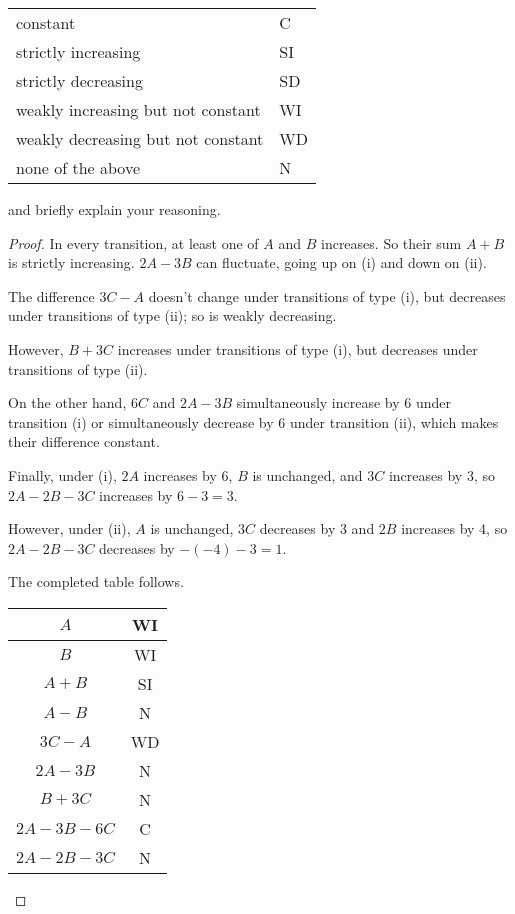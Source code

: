 \documentclass[14pt]{extarticle}
\begin{document}
\begin{center}
\begin{tabular}{|ll|}
\hline
constant & C \\
strictly increasing & SI \\
strictly decreasing & SD \\
weakly increasing but not constant & WI \\
weakly decreasing but not constant & WD \\
none of the above & N \\
\hline
\end{tabular}
\end{center}

and briefly explain your reasoning.

\begin{proof}
In every transition, at least one of $A$ and $B$ increases. So their sum $A+B$ is strictly increasing. $2A - 3B$ can fluctuate, going up on (i) and down on (ii).

The difference $3C - A$ doesn’t change under transitions of type (i), but decreases under transitions of type (ii); so is weakly decreasing.

However, $B+3C$ increases under transitions of type (i), but decreases under transitions of type (ii).

On the other hand, $6C$ and $2A - 3B$ simultaneously increase by 6 under transition (i) or simulta­neously decrease by 6 under transition (ii), which makes their difference constant.

Finally, under (i), $2A$ increases by 6, $B$ is unchanged, and $3C$ increases by 3, so $2A - 2B - 3C$ increases by $6 - 3 = 3$. 

However, under (ii), $A$ is unchanged, $3C$ decreases by 3 and $2B$ increases by 4, so $2A - 2B - 3C$ decreases by $-(-4) - 3 = 1$.

The completed table follows.

\begin{center}
\begin{tabular}{|c|c|}
\hline
$A$ & WI \\
\hline
$B$ & WI \\
\hline
$A + B$ & SI \\
\hline
$A - B$ & N \\
\hline
$3C - A$ & WD \\
\hline
$2A - 3B$ & N \\
\hline
$B + 3C$ & N \\
\hline
$2A - 3B - 6C$ & C \\
\hline
$2A - 2B - 3C$ & N \\
\hline
\end{tabular}
\end{center}
\end{proof}
\end{document}
